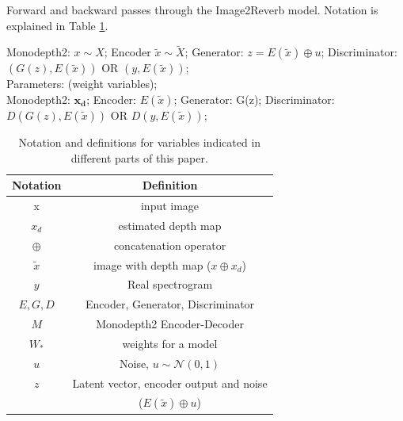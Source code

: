 \documentclass[10pt,twocolumn,letterpaper]{article}
\begin{document}
\begin{algorithm}
    \caption{Forward and backward passes through the Image2Reverb model. Notation is explained in Table \ref{tab:vardefinitions}.}
    \label{algo:model}
    \KwIn{}
    Monodepth2: $x \sim X$; Encoder $\tilde{x} \sim \tilde{X}$; Generator: $z = E(\tilde{x}) \oplus u$; Discriminator: $(G(z), E(\tilde{x}))$ OR $(y, E(\tilde{x}))$;\\
    Parameters: (weight variables);\\
    \KwOut{}
    Monodepth2: $\mathbf{x_d}$; Encoder: $E(\tilde{x})$; Generator: G(z); Discriminator: $D(G(z), E(\tilde{x}))$ OR $D(y, E(\tilde{x}))$; \\
\end{algorithm}

\begin{table}[ht]
    \small
    \centering
    \begin{tabular}{c|c}
        Notation & Definition \\
        \hline
         x & input image \\
         ${x_d}$ & estimated depth map \\
         $\oplus$ & concatenation operator\\
         $\tilde{x}$ & image with depth map ($x \oplus {x_d}$) \\
         $y$ & Real spectrogram \\
         $E, G, D$ & Encoder, Generator, Discriminator\\
         $M$ & Monodepth2 Encoder-Decoder \\
         ${W_*}$ & weights for a model \\
         $u$ & Noise, $u \sim \mathcal{N}(0, 1) $\\
         $z$ & Latent vector, encoder output and noise\\ & ($E(\tilde{x}) \oplus u$) \\
    \end{tabular}
    \caption{Notation and definitions for variables indicated in different parts of this paper.}
    \label{tab:vardefinitions}
\end{table}
\end{document}
